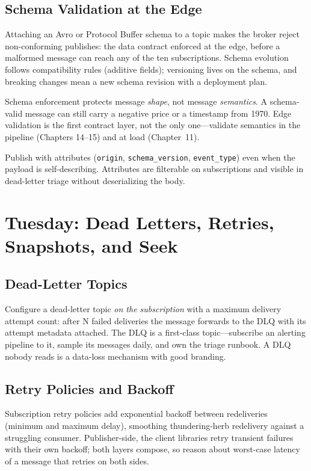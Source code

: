 \subsection{Schema Validation at the Edge}
Attaching an Avro or Protocol Buffer schema to a topic makes the broker reject non-conforming publishes: the data contract enforced at the edge, before a malformed message can reach any of the ten subscriptions. Schema evolution follows compatibility rules (additive fields); versioning lives on the schema, and breaking changes mean a new schema revision with a deployment plan.

\begin{pitfall}
Schema enforcement protects message \emph{shape}, not message \emph{semantics}. A schema-valid message can still carry a negative price or a timestamp from 1970. Edge validation is the first contract layer, not the only one---validate semantics in the pipeline (Chapters 14--15) and at load (Chapter~11).
\end{pitfall}

\begin{tipbox}
Publish with attributes (\texttt{origin}, \texttt{schema\_version}, \texttt{event\_type}) even when the payload is self-describing. Attributes are filterable on subscriptions and visible in dead-letter triage without deserializing the body.
\end{tipbox}

\section{Tuesday: Dead Letters, Retries, Snapshots, and Seek}

\subsection{Dead-Letter Topics}
Configure a dead-letter topic \emph{on the subscription} with a maximum delivery attempt count: after N failed deliveries the message forwards to the DLQ with its attempt metadata attached. The DLQ is a first-class topic---subscribe an alerting pipeline to it, sample its messages daily, and own the triage runbook. A DLQ nobody reads is a data-loss mechanism with good branding.

\subsection{Retry Policies and Backoff}
Subscription retry policies add exponential backoff between redeliveries (minimum and maximum delay), smoothing thundering-herb redelivery against a struggling consumer. Publisher-side, the client libraries retry transient failures with their own backoff; both layers compose, so reason about worst-case latency of a message that retries on both sides.

